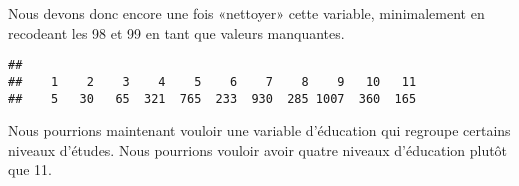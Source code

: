 \documentclass[
]{book}
\newenvironment{Shaded}{\begin{snugshade}}{\end{snugshade}}
\newcommand{\CommentTok}[1]{\textcolor[rgb]{0.56,0.35,0.01}{\textit{#1}}}
\newcommand{\ConstantTok}[1]{\textcolor[rgb]{0.00,0.00,0.00}{#1}}
\newcommand{\DecValTok}[1]{\textcolor[rgb]{0.00,0.00,0.81}{#1}}
\newcommand{\FunctionTok}[1]{\textcolor[rgb]{0.00,0.00,0.00}{#1}}
\newcommand{\NormalTok}[1]{#1}
\newcommand{\OtherTok}[1]{\textcolor[rgb]{0.56,0.35,0.01}{#1}}
\newcommand{\SpecialCharTok}[1]{\textcolor[rgb]{0.00,0.00,0.00}{#1}}
\begin{document}
Nous devons donc encore une fois «nettoyer» cette variable, minimalement en recodeant les 98 et 99 en tant que valeurs manquantes.

\begin{Shaded}
\end{Shaded}

\begin{verbatim}
## 
##    1    2    3    4    5    6    7    8    9   10   11 
##    5   30   65  321  765  233  930  285 1007  360  165
\end{verbatim}

Nous pourrions maintenant vouloir une variable d'éducation qui regroupe certains niveaux d'études. Nous pourrions vouloir avoir quatre niveaux d'éducation plutôt que 11.
\end{document}
